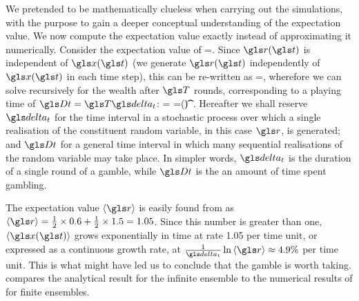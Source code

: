 %
%

We pretended to be mathematically clueless when carrying out the simulations,
with the purpose to gain a deeper conceptual understanding of the expectation 
value. We now compute the expectation value exactly instead of 
approximating it numerically. Consider the expectation value of   
\be
\ave{\x(\t+\dt)}=\ave{\x(\t)\gr(\t)}. 
\ee
Since $\gr(\t)$ is independent of $\x(\t)$ (we generate $\gr(\t)$ 
independently of $\x(\t)$ in each time step), this can be re-written as
\be
\ave{\x(\t+\dt)}=\ave{\x(\t)}\ave{\gr},
\ee
wherefore we can solve recursively for the wealth after $\T$ rounds, corresponding to a playing time of $\Dt=\T\dt$:
\be
\ave{\x(\t+\Dt)} = \ave{\x(\t+\T\dt)}=\x(\t)\ave{\gr}^\T.
\ee
Hereafter we shall reserve $\dt$ for the time interval in a stochastic process over which a single realisation of the constituent random variable, in this case $\gr$, is generated; and $\Dt$ for a general time interval in which many sequential realisations of the random variable may take place. In simpler words, $\dt$ is the duration of a single round of a gamble, while $\Dt$ is the an amount of time spent gambling.

The expectation value $\ave{\gr}$ is easily found from  
as $\ave{\gr}=\frac{1}{2}\times 0.6 + \frac{1}{2}\times 1.5=1.05$. Since 
this number is greater than one, $\ave{\x(\t)}$ grows exponentially in 
time at rate 1.05 per time unit, or expressed as a continuous 
growth rate, at $\frac{1}{\dt}\ln \ave{\gr}\approx4.9\%$ per time 
unit. This is what might have led us to
conclude that the gamble is worth taking.  compares the
analytical result for the infinite ensemble to the numerical results 
of  for finite ensembles.

